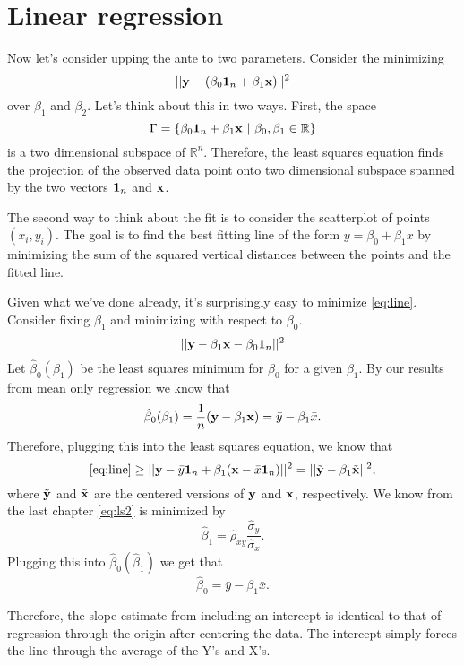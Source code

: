 \chapter{Linear regression}

Now let's consider upping the ante to two parameters. Consider the minimizing
\begin{equation}
\label{eq:line}
|| \mathbf{y} - (\beta_0 \mathbf{1}_n + \beta_1 \mathbf{x}) ||^2
\end{equation}
over $\beta_1$ and $\beta_2$. Let's think about this in two ways. 
First, the space $$\Gamma = \{\beta_0 \mathbf{1}_n + \beta_1 \mathbf{x} ~|~ \beta_0, \beta_1 \in \mathbb{R}\}$$
is a two dimensional subspace of $\mathbb{R}^n$. Therefore, the least squares
equation finds the projection of the observed data point 
onto two dimensional subspace spanned by the two vectors $\mathbf{1}_n$ and $\mathbf{x}$.

The second way to think about the fit is to consider the scatterplot
of points $(x_i, y_i)$. The goal is to find the best fitting line
of the form $y = \beta_0 + \beta_1 x$ by minimizing the sum of the
squared vertical distances between the points and the fitted line. 

Given what we've done already, it's surprisingly easy to minimize
\eqref{eq:line}. Consider fixing $\beta_1$ and minimizing
with respect to $\beta_0$.
$$
|| \mathbf{y} - \beta_1 \mathbf{x}  - \beta_0 \mathbf{1}_n ||^2
$$
Let $\hat \beta_0 (\beta_1)$ be the least squares minimum for $\beta_0$
for a given $\beta_1$. 
By our results from mean only regression we know that
\begin{equation*}
\label{eq:intercept}
\hat \beta_0 (\beta_1) = \frac{1}{n}(\mathbf{y} - \beta_1 \mathbf{x}) = \bar y - \beta_1 \bar x.
\end{equation*}
Therefore, plugging this into the least squares equation, we know that
\begin{equation}
\label{eq:ls2}
\eqref{eq:line} \geq 
|| \mathbf{y} -  \bar y \mathbf{1}_n + \beta_1 (\mathbf{x}  - \bar x \mathbf{1}_n) ||^2= || \tilde {\mathbf{y}} - \beta_1 \tilde {\mathbf{x}}||^2,
\end{equation}
where $\tilde {\mathbf{y}}$ and $\tilde {\mathbf{x}}$ are the centered versions of $\mathbf{y}$ and
$\mathbf{x}$, respectively. We know from the last chapter \eqref{eq:ls2} is minimized 
by 
$$\hat \beta_1 = \hat \rho_{xy} \frac{\hat \sigma_y}{\hat \sigma_x}.$$
Plugging this into $\hat \beta_0(\hat \beta_1)$ we get that
$$
\hat \beta_0 = \bar y - \beta_1 \bar x.
$$

Therefore, the slope estimate from including an intercept is identical to that of
regression through  the origin after centering the data. The intercept simply
forces the line through the average of the Y's and X's.

